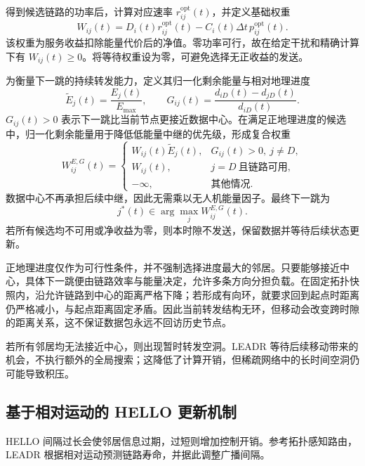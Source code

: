 得到候选链路的功率后，计算对应速率 $r_{ij}^{\mathrm{opt}}(t)$，并定义基础权重
\begin{equation}
 W_{ij}(t)=D_i(t)r_{ij}^{\mathrm{opt}}(t)
                   -C_i(t)\Delta t\,p_{ij}^{\mathrm{opt}}(t).
 \label{rq1:eq:base_weight}
\end{equation}
该权重为服务收益扣除能量代价后的净值。零功率可行，故在给定干扰和精确计算下有 $W_{ij}(t)\ge0$。将等待权重设为零，可避免选择无正收益的发送。

为衡量下一跳的持续转发能力，定义其归一化剩余能量与相对地理进度
\begin{equation}
 \widetilde E_j(t)=\frac{E_j(t)}{E_{\max}},\qquad
 G_{ij}(t)=\frac{d_{iD}(t)-d_{jD}(t)}{d_{iD}(t)}.
 \label{rq1:eq:energy_geography}
\end{equation}
$G_{ij}(t)>0$ 表示下一跳比当前节点更接近数据中心。在满足正地理进度的候选中，归一化剩余能量用于降低低能量中继的优先级，形成复合权重
\begin{equation}
 W_{ij}^{E,G}(t)=
 \begin{cases}
 W_{ij}(t)\widetilde E_j(t),&G_{ij}(t)>0,\ j\ne D,\\
 W_{ij}(t),&j=D\ \text{且链路可用},\\
 -\infty,&\text{其他情况}.
 \end{cases}
 \label{rq1:eq:composite_weight}
\end{equation}
数据中心不再承担后续中继，因此无需乘以无人机能量因子。最终下一跳为
\begin{equation}
 j^*(t)\in\arg\max_jW_{ij}^{E,G}(t).
 \label{rq1:eq:next_hop}
\end{equation}
若所有候选均不可用或净收益为零，则本时隙不发送，保留数据并等待后续状态更新。

正地理进度仅作为可行性条件，并不强制选择进度最大的邻居。只要能够接近中心，具体下一跳便由链路效率与能量决定，允许多条方向分担负载。在固定拓扑快照内，沿允许链路到中心的距离严格下降；若形成有向环，就要求回到起点时距离仍严格减小，与起点距离固定矛盾。因此当前转发结构无环，但移动会改变跨时隙的距离关系，这不保证数据包永远不回访历史节点。

若所有邻居均无法接近中心，则出现暂时转发空洞。LEADR 等待后续移动带来的机会，不执行额外的全局搜索；这降低了计算开销，但稀疏网络中的长时间空洞仍可能导致积压。

\subsection{基于相对运动的 HELLO 更新机制}

HELLO 间隔过长会使邻居信息过期，过短则增加控制开销。参考拓扑感知路由\cite{qtar}，LEADR 根据相对运动预测链路寿命，并据此调整广播间隔。

